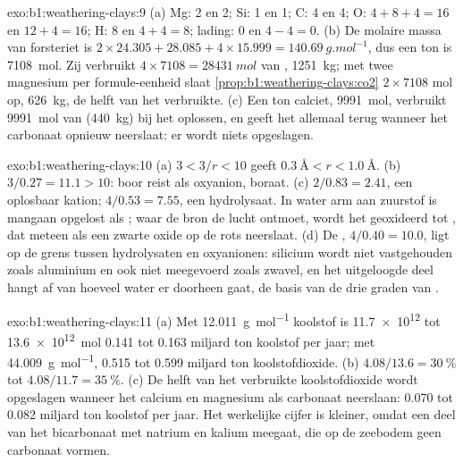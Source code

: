 \begin{solution}{exo:b1:weathering-clays:9}
(a) Mg: 2 en 2; Si: 1 en 1; C: 4 en 4; O: $4 + 8 + 4 = 16$ en $12 + 4 =
16$; H: 8 en $4 + 4 = 8$; lading: 0 en $4 - 4 = 0$. (b) De molaire massa van
forsteriet is $2\times24.305 + 28.085 + 4\times15.999 =
\qty{140.69}{g.mol^{-1}}$, dus een ton is \qty{7108}{mol}. Zij verbruikt
$4\times7108 = \qty{28431}{mol}$ van , \qty{1251}{kg}; met twee
magnesium per formule-eenheid slaat \cref{prop:b1:weathering-clays:co2}
$2\times7108$ mol op, \qty{626}{kg}, de helft van het verbruikte. (c) Een ton calciet,
\qty{9991}{mol}, verbruikt \qty{9991}{mol} van  (\qty{440}{kg}) bij het oplossen,
en geeft het allemaal terug wanneer het carbonaat opnieuw neerslaat: er wordt niets
opgeslagen.
\end{solution}

\begin{solution}{exo:b1:weathering-clays:10}
(a) $3 < 3/r < 10$ geeft $\qty{0.3}{\angstrom} < r < \qty{1.0}{\angstrom}$.
(b) $3/0.27 = 11.1 > 10$: boor reist als oxyanion, boraat. (c) $2/0.83 =
2.41$, een oplosbaar kation; $4/0.53 = 7.55$, een hydrolysaat. In water arm aan
zuurstof is mangaan opgelost als ; waar de bron de lucht ontmoet, wordt het
geoxideerd tot , dat meteen als een zwarte oxide op de rots neerslaat. (d) De
, $4/0.40 = 10.0$, ligt op de grens tussen hydrolysaten en oxyanionen:
silicium wordt niet vastgehouden zoals aluminium en ook niet meegevoerd zoals zwavel, en
het uitgeloogde deel hangt af van hoeveel water er doorheen gaat, de basis van de drie
graden van .
\end{solution}

\begin{solution}{exo:b1:weathering-clays:11}
(a) Met \qty{12.011}{g.mol^{-1}} koolstof is \num{11.7e12} tot
\qty{13.6e12}{mol} 0.141 tot 0.163 miljard ton koolstof per jaar; met
\qty{44.009}{g.mol^{-1}}, 0.515 tot 0.599 miljard ton koolstofdioxide.
(b) $4.08/13.6 = \qty{30}{\percent}$ tot $4.08/11.7 = \qty{35}{\percent}$.
(c) De helft van het verbruikte koolstofdioxide wordt opgeslagen wanneer het calcium en
magnesium als carbonaat neerslaan: 0.070 tot 0.082 miljard ton koolstof per jaar. Het
werkelijke cijfer is kleiner, omdat een deel van het bicarbonaat met natrium en kalium
meegaat, die op de zeebodem geen carbonaat vormen.
\end{solution}

